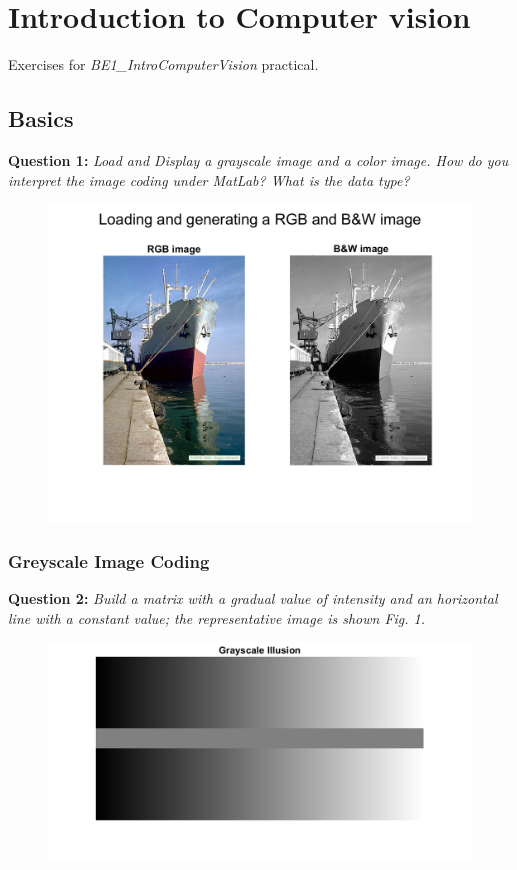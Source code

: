 \section{Introduction to Computer vision}
\label{sec:introduction_to_computer_vision}

Exercises for \textit{BE1\_IntroComputerVision} practical.

\subsection{Basics}

\textbf{Question 1:}
\textit{Load and Display a grayscale image and a color image. How do you interpret the image coding under MatLab? What is the data type?}

\begin{figure}[H]
    \centering
    \includegraphics[width=0.5\linewidth]{Doc/Graphics/Part1/Part1_Question1.png}
    \label{fig:enter-label}
\end{figure}


\subsubsection{Greyscale Image Coding}

\textbf{Question 2:}
\textit{Build a matrix with a gradual value of intensity and an horizontal line with a constant value; the representative image is shown Fig. 1.}

\begin{figure}[H]
    \centering
    \includegraphics[width=0.5\linewidth]{Doc/Graphics/Part1/Part1_Question2.png}
    \label{fig:enter-label}
\end{figure}



